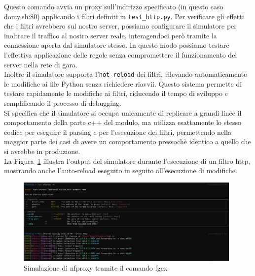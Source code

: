 Questo comando avvia un proxy sull'indirizzo specificato (in questo caso domy.sh:80) applicando i filtri definiti in \texttt{test\_http.py}.
Per verificare gli effetti che i filtri avrebbero sul nostro server, possiamo configurare il simulatore per inoltrare il traffico al nostro server reale, interagendoci però tramite la connessione aperta dal simulatore stesso. In questo modo possiamo testare l'effettiva applicazione delle regole senza compromettere il funzionamento del server nella rete di gara.  \\
Inoltre il simulatore supporta l'\texttt{hot-reload} dei filtri, rilevando automaticamente le modifiche ai file Python senza richiedere riavvii. Questo sistema permette di testare rapidamente le modifiche ai filtri, riducendo il tempo di sviluppo e semplificando il processo di debugging.\\
Si specifica che il simulatore si occupa unicamente di replicare a grandi linee il comportamento della parte c++ del modulo, ma utilizza esattamente lo stesso codice per eseguire il parsing e per l'esecuzione dei filtri, permettendo nella maggior parte dei casi di avere un comportamento pressochè identico a quello che si avrebbe in produzione.\\
La Figura~\ref{fig:nfproxy_sim} illustra l'output del simulatore durante l'esecuzione di un filtro http, mostrando anche l'auto-reload eseguito in seguito all'esecuzione di modifiche.

\begin{figure}[H]
    \centering
    \includegraphics[width=0.98\textwidth]{images/chapter3/nfproxy_sim.png}
    \caption{Simulazione di nfproxy tramite il comando fgex}\label{fig:nfproxy_sim}
\end{figure}

